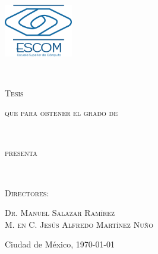 \documentclass[
11pt, %
spanish, %
singlespacing, %
headsepline, %
]{MastersDoctoralThesis} %
\begin{document}
\begin{titlepage}
    \begin{minipage}[c][0.81\textheight][t]{0.22\textwidth}
        \vspace*{5mm}
        \begin{center}
            \hskip2.0mm
            \vrule width 1pt height 13cm
            \vspace{5mm}
            \hskip2pt
            \vrule width 2.5pt height 13cm
            \hskip2mm
            \vrule width 1pt height 13cm \\
            \vspace{3mm}
            \includegraphics[height=2.3cm]{Figuras/logo-escom.png}
        \end{center}
    \end{minipage}
    \begin{minipage}[c][0.81\textheight][t]{0.73\textwidth}
        \begin{center}
            \vspace{1cm}

                \textsc{\large \ttitle}\\

            \vspace{2.5cm}

            \textsc{\Large Tesis}\\
            \vspace{0.5cm}

            \textsc{\large que para obtener el grado de}\\
            \vspace{0.5cm}

            \textsc{\large \degreename}\\
            \vspace{0.5cm}

            \textsc{\large presenta}\\
            \vspace{0.5cm}

            \textsc{\large \authorname}\\
            \vspace{2.5cm}

            \textsc{\large Directores:}\\
            \vspace{0.5cm}

            \textsc{\large Dr. Manuel Salazar Ramírez \\
M. en C. Jesús Alfredo Martínez Nuño}\\
            \vspace{0.5cm}

            \large{Ciudad de México, \today}
        \end{center}
    \end{minipage}
\end{titlepage}
\end{document}
